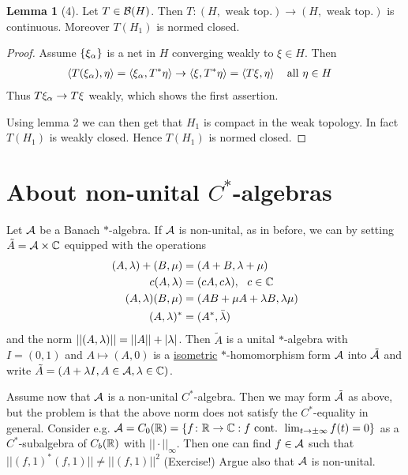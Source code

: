 \documentclass[10pt,english,a4paper]{article}
\theoremstyle{definition}
\newtheorem*{lemma}{Lemma}
\begin{document}
\begin{lemma}[4]
    Let $T \in \mathcal{B}(H)$. Then $T \colon (H ,\text{ weak top.}) \to (H, \text{ weak top.})$
is continuous. Moreover $T(H_1)$ is normed closed.
\end{lemma}
\begin{proof}
    Assume $\{\xi_{\alpha}\}$ is a net in $H$ converging weakly to $\xi \in H$.
    Then
    \begin{align*}
        \left\langle T(\xi_{\alpha}),\eta \right\rangle &= \left\langle \xi_{\alpha}, T^*\eta \right\rangle \to
        \left\langle \xi,T^*\eta \right\rangle= \left\langle T\xi,\eta \right\rangle ~~\text{ all } \eta\in H 
    \end{align*}
    Thus $T\xi_{\alpha} \to T\xi$ weakly, which shows the first assertion.

    Using lemma 2 we can then get that $H_1$ is compact in the weak topology. 
    In fact $T(H_1)$ is weakly closed. Hence $T(H_1)$ is normed closed. 
\end{proof}


\section{About non-unital $C^*$-algebras}
Let $\mathcal{A}$ be a Banach $*$-algebra. If $\mathcal{A}$ is non-unital, as in before, we can 
 by setting $\tilde{A} = \mathcal{A}\times\mathbb{C}$ equipped 
with the operations 
\begin{align*}
    (A,\lambda) + (B,\mu) &= (A+B, \lambda+\mu) \\
    c(A,\lambda) &= (cA,c\lambda), ~~c \in \mathbb{C} \\
    (A,\lambda)(B,\mu) &= (AB + \mu A + \lambda B, \lambda\mu) \\
    (A,\lambda)^* &= (A^*, \bar{\lambda})
\end{align*}
and the norm $||(A,\lambda)|| = ||A|| + |\lambda|$.
Then $\tilde{A}$ is a unital $*$-algebra with $I = (0,1)$ and 
$A\mapsto (A,0)$ is a \ul{isometric} $*$-homomorphism form $\mathcal{A}$ into $\tilde{\mathcal{A}}$ 
and write $\tilde{A} = (A + \lambda I, A \in \mathcal{A}, \lambda \in \mathbb{C})$.

Assume now that $\mathcal{A}$ is a non-unital $C^*$-algebra. Then we may form $\tilde{\mathcal{A}}$
as above, but the problem is that the above norm does not satisfy the $C^*$-equality
in general. Consider e.g. $\mathcal{A} = C_{0}(\mathbb{R}) = \{f \colon \mathbb{R} \to \mathbb{C} : f \text{
cont. } \lim_{t\to\pm\infty}f(t) =0\}$ as a $C^*$-subalgebra of $C_b(\mathbb{R})$ with
$||\cdot||_{\infty}$.
Then one can find $f \in \mathcal{A}$ such that $||(f,1)^*(f,1)|| \neq ||(f,1)||^2$ (Exercise!)
Argue also that $\mathcal{A}$ is non-unital.
\end{document}
